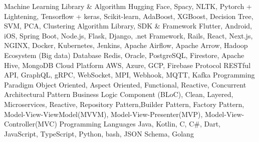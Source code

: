 
\horizontalLineRight

\skillItem
    {Machine Learning Library \& Algorithm}
    {Hugging Face, Spacy, NLTK, Pytorch + Lightening, Tensorflow + keras, Scikit-learn, AdaBoost, XGBoost, Decision Tree, SVM, PCA, Clustering Algorithm}
\skillItem
    {Library, SDK \& Framework}
    {Flutter, Android, iOS, Spring Boot, Node.js, Flask,
        Django, .net Framework, Rails,
        React, Next.js, NGINX, Docker, Kubernetes,
        Jenkins, Apache Airflow, Apache Arrow, Hadoop Ecosystem (Big data)}
\skillItem
    {Database}
    {Redis, Oracle, PostgreSQL, Firestore, Apache Hive, MongoDB}
\skillItem
    {Cloud Platform}
    {AWS, Azure, GCP, Firebase}
\skillItem
    {Protocol}
    {RESTful API, GraphQL, gRPC, WebSocket, MPI, Webhook, MQTT, Kafka}
\skillItem
    {Programming Paradigm}
    {Object Oriented, Aspect Oriented, Functional, Reactive, Concurrent}
\skillItem
    {Architectural Pattern}
    {Business Logic Component (BLoC), Clean, Layered, Microservices, Reactive, Repository Pattern,Builder Pattern,
        Factory Pattern, Model-View-ViewModel(MVVM), Model-View-Presenter(MVP), Model-View-Controller(MVC)}
\skillItem
    {Programming Languages}
    {Java, Kotlin, C, C\#, Dart, JavaScript, TypeScript, Python, bash, JSON Schema, Golang}